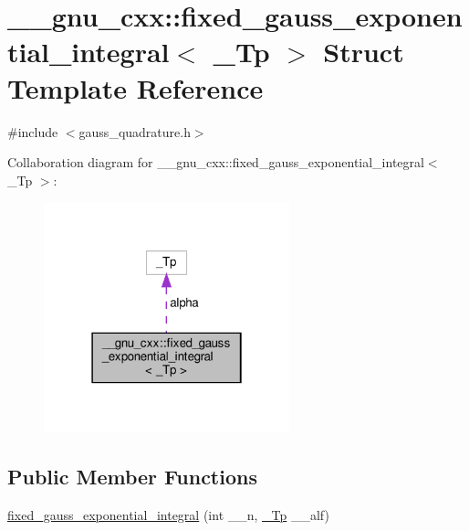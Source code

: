 \hypertarget{struct____gnu__cxx_1_1fixed__gauss__exponential__integral}{}\section{\+\_\+\+\_\+gnu\+\_\+cxx\+:\+:fixed\+\_\+gauss\+\_\+exponential\+\_\+integral$<$ \+\_\+\+Tp $>$ Struct Template Reference}
\label{struct____gnu__cxx_1_1fixed__gauss__exponential__integral}


{\ttfamily \#include $<$gauss\+\_\+quadrature.\+h$>$}



Collaboration diagram for \+\_\+\+\_\+gnu\+\_\+cxx\+:\+:fixed\+\_\+gauss\+\_\+exponential\+\_\+integral$<$ \+\_\+\+Tp $>$\+:
\nopagebreak
\begin{figure}[H]
\begin{center}
\leavevmode
\includegraphics[width=202pt]{struct____gnu__cxx_1_1fixed__gauss__exponential__integral__coll__graph}
\end{center}
\end{figure}
\subsection*{Public Member Functions}
\begin{DoxyCompactItemize}
\item 
\hyperlink{struct____gnu__cxx_1_1fixed__gauss__exponential__integral_a6ea4877ba4237e76210f194531edfa8e}{fixed\+\_\+gauss\+\_\+exponential\+\_\+integral} (int \+\_\+\+\_\+n, \hyperlink{namespace____gnu__cxx_a3b19a9c800ca194374ef9172290f7d79}{\+\_\+\+Tp} \+\_\+\+\_\+alf)
\end{DoxyCompactItemize}

